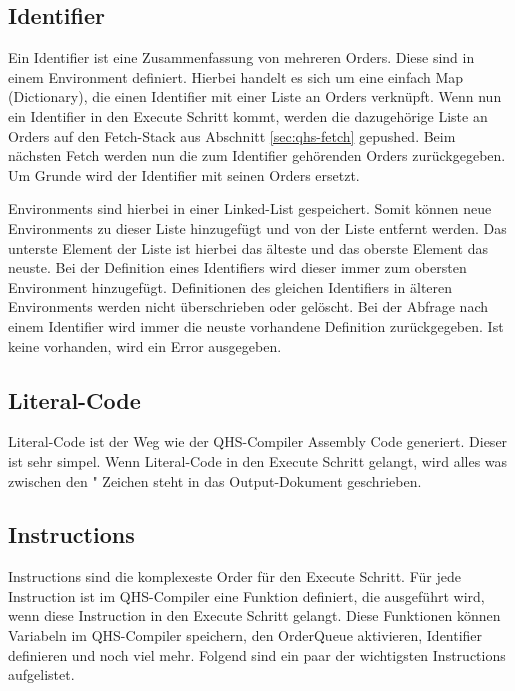 \subsection{Identifier}
Ein Identifier ist eine Zusammenfassung von mehreren Orders. Diese sind in einem Environment definiert. Hierbei handelt es sich um eine einfach Map (Dictionary), die einen Identifier mit einer Liste an Orders verknüpft.
Wenn nun ein Identifier in den Execute Schritt kommt, werden die dazugehörige Liste an Orders auf den Fetch-Stack aus Abschnitt \ref{sec:qhs-fetch} gepushed.
Beim nächsten Fetch werden nun die zum Identifier gehörenden Orders zurückgegeben. Um Grunde wird der Identifier mit seinen Orders ersetzt.

Environments sind hierbei in einer Linked-List gespeichert. Somit können neue Environments zu dieser Liste hinzugefügt und von der Liste entfernt werden. Das unterste Element der Liste ist hierbei das älteste und das oberste Element das neuste.
Bei der Definition eines Identifiers wird dieser immer zum obersten Environment hinzugefügt. Definitionen des gleichen Identifiers in älteren Environments werden nicht überschrieben oder gelöscht.
Bei der Abfrage nach einem Identifier wird immer die neuste vorhandene Definition zurückgegeben. Ist keine vorhanden, wird ein Error ausgegeben.

\subsection{Literal-Code}
Literal-Code ist der Weg wie der QHS-Compiler Assembly Code generiert. Dieser ist sehr simpel. Wenn Literal-Code in den Execute Schritt gelangt, wird alles was zwischen den " Zeichen steht in das Output-Dokument geschrieben.

\subsection{Instructions}
Instructions sind die komplexeste Order für den Execute Schritt. Für jede Instruction ist im QHS-Compiler eine Funktion definiert, die ausgeführt wird, wenn diese Instruction in den Execute Schritt gelangt.
Diese Funktionen können Variabeln im QHS-Compiler speichern, den OrderQueue aktivieren, Identifier definieren und noch viel mehr. Folgend sind ein paar der wichtigsten Instructions aufgelistet.

